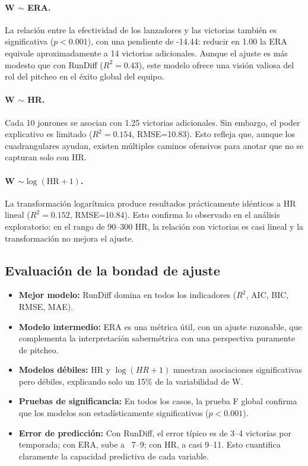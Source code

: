 \documentclass[10pt]{article}
\begin{document}
\paragraph{W \(\sim\) ERA.}  
La relación entre la efectividad de los lanzadores y las victorias también es significativa (\(p<0.001\)), con una pendiente de -14.44: reducir en 1.00 la ERA equivale aproximadamente a 14 victorias adicionales. Aunque el ajuste es más modesto que con RunDiff (\(R^2=0.43\)), este modelo ofrece una visión valiosa del rol del pitcheo en el éxito global del equipo.

\paragraph{W \(\sim\) HR.}  
Cada 10 jonrones se asocian con 1.25 victorias adicionales. Sin embargo, el poder explicativo es limitado (\(R^2=0.154\), RMSE=10.83). Esto refleja que, aunque los cuadrangulares ayudan, existen múltiples caminos ofensivos para anotar que no se capturan solo con HR.

\paragraph{W \(\sim \log(\text{HR}+1)\).}  
La transformación logarítmica produce resultados prácticamente idénticos a HR lineal (\(R^2=0.152\), RMSE=10.84). Esto confirma lo observado en el análisis exploratorio: en el rango de 90–300 HR, la relación con victorias es casi lineal y la transformación no mejora el ajuste.

\subsection{Evaluación de la bondad de ajuste}

\begin{itemize}
    \item \textbf{Mejor modelo:} RunDiff domina en todos los indicadores (\(R^2\), AIC, BIC, RMSE, MAE).
    \item \textbf{Modelo intermedio:} ERA es una métrica útil, con un ajuste razonable, que complementa la interpretación sabermétrica con una perspectiva puramente de pitcheo.
    \item \textbf{Modelos débiles:} HR y \(\log(HR+1)\) muestran asociaciones significativas pero débiles, explicando solo un 15\% de la variabilidad de W.
    \item \textbf{Pruebas de significancia:} En todos los casos, la prueba F global confirma que los modelos son estadísticamente significativos (\(p<0.001\)).
    \item \textbf{Error de predicción:} Con RunDiff, el error típico es de 3–4 victorias por temporada; con ERA, sube a ~7–9; con HR, a casi 9–11. Esto cuantifica claramente la capacidad predictiva de cada variable.
\end{itemize}
\end{document}
